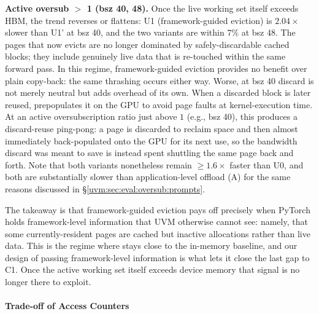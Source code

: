 \textbf{Active oversub $>$ 1 (bsz 40, 48).}
Once the live working set itself exceeds HBM,
    the trend reverses or flattens:
    U1 (framework-guided eviction) is $2.04\times$ slower than U1' at bsz 40,
    and the two variants are within $7\%$ at bsz 48.
The pages that {\uvmname} now evicts are no longer dominated by safely-discardable cached blocks;
    they include genuinely live data
    that is re-touched within the same forward pass.
In this regime, framework-guided eviction provides no benefit over plain copy-back:
    the same thrashing occurs either way.
Worse, at bsz 40 discard is not merely neutral but adds overhead of its own.
When a discarded block is later reused,
    {\uvmname} prepopulates it on the GPU to avoid page faults at kernel-execution time.
At an active oversubscription ratio just above $1$ (e.g., bsz 40),
    this produces a discard-reuse ping-pong:
    a page is discarded to reclaim space
    and then almost immediately back-populated onto the GPU for its next use,
    so the bandwidth discard was meant to save is instead spent
    shuttling the same page back and forth.
Note that both variants nonetheless remain $\geq$$1.6\times$ faster than U0,
    and both are substantially slower than application-level offload (A)
    for the same reasons discussed in \S\ref{uvm:sec:eval:oversub:prompts}.

The takeaway is that framework-guided eviction pays off precisely when
    PyTorch holds framework-level information that UVM otherwise cannot see:
    namely, that some currently-resident pages are cached but inactive allocations
    rather than live data.
This is the regime where {\uvmname} stays close to the in-memory baseline,
    and our design of passing framework-level information is what lets it close the last gap to C1.
Once the active working set itself exceeds device memory
    that signal is no longer there to exploit.
\paragraph{Trade-off of Access Counters}
\label{uvm:sec:eval:design:counters}

